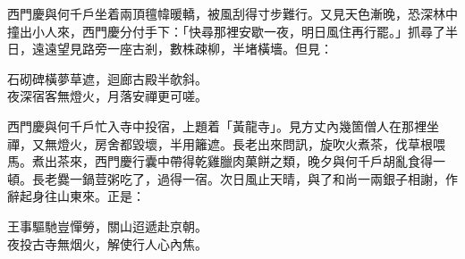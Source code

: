 西門慶與何千戶坐着兩頂氊幃暖轎，被風刮得寸步難行。又見天色漸晚，恐深林中撞出小人來，西門慶分付手下：「快尋那裡安歇一夜，明日風住再行罷。」抓尋了半日，遠遠望見路旁一座古剎，數株疎柳，半堵橫墻。但見：

\begin{myquote}
石砌碑橫夢草遮，迴廊古殿半欹斜。\\夜深宿客無燈火，月落安禪更可嗟。
\end{myquote}

西門慶與何千戶忙入寺中投宿，上題着「黃龍寺」。見方丈內幾箇僧人在那裡坐禪，又無燈火，房舍都毀壞，半用籬遮。{}長老出來問訊，旋吹火煮茶，伐草根喂馬。煮出茶來，西門慶行囊中帶得乾雞臘肉菓餅之類，晚夕與何千戶胡亂食得一頓。長老爨一鍋荳粥吃了，過得一宿。次日風止天晴，與了和尚一兩銀子相謝，作辭起身往山東來。正是：

\begin{myquote}
王事驅馳豈憚勞，關山迢遞赴京朝。\\夜投古寺無烟火，解使行人心內焦。
\end{myquote}

